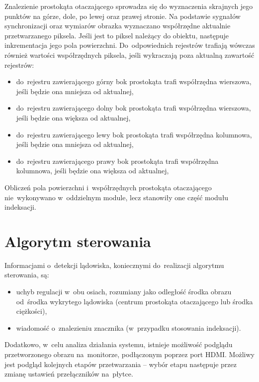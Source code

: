 Znalezienie prostokąta otaczającego sprowadza się do wyznaczenia skrajnych jego punktów na górze, dole, po lewej oraz prawej stronie. 
Na podstawie sygnałów synchronizacji oraz wymiarów obrazka wyznaczano współrzędne aktualnie przetwarzanego piksela. 
Jeśli jest to piksel należący do obiektu, następuje inkrementacja jego pola powierzchni. 
Do~odpowiednich rejestrów trafiają wówczas również wartości współrzędnych piksela, jeśli wykraczają poza aktualną zawartość rejestrów:
\begin{itemize}
	\item do~rejestru zawierającego górny bok prostokąta trafi współrzędna wierszowa, jeśli będzie ona mniejsza od aktualnej,
	\item do~rejestru zawierającego dolny bok prostokąta trafi współrzędna wierszowa, jeśli będzie ona większa od aktualnej,
	\item do~rejestru zawierającego lewy bok prostokąta trafi współrzędna kolumnowa, jeśli będzie ona mniejsza od aktualnej,
	\item do~rejestru zawierającego prawy bok prostokąta trafi współrzędna kolumnowa, jeśli będzie ona większa od aktualnej,
\end{itemize}  
Obliczeń pola powierzchni i~współrzędnych prostokąta otaczającego nie~wykonywano w~oddzielnym module, lecz stanowiły one część modułu indeksacji.


\section{Algorytm sterowania}
\label{sec:algorytm_sterowania}

Informacjami o~detekcji lądowiska, koniecznymi do~realizacji algorytmu sterowania, są:
\begin{itemize}
	\item uchyb regulacji w~obu osiach, rozumiany jako odległość środka obrazu od~środka wykrytego lądowiska (centrum prostokąta otaczającego lub środka ciężkości),
	\item wiadomość o~znalezieniu znacznika (w~przypadku stosowania indeksacji). %
\end{itemize}


Dodatkowo, w~celu analiza działania systemu, istnieje możliwość podglądu przetworzonego obrazu na~monitorze, podłączonym poprzez port HDMI. 
Możliwy jest podgląd kolejnych etapów przetwarzania -- wybór etapu następuje przez zmianę ustawień przełączników na~płytce.

